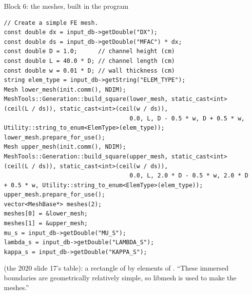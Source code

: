 \documentclass[aspectratio=169,11pt]{beamer}
\begin{document}
\begin{frame}[fragile]{Block 6: the meshes, built in the program}
\label{fr:meshes}
\begin{lstlisting}[style=cpptiny]
// Create a simple FE mesh.
const double dx = input_db->getDouble("DX");
const double ds = input_db->getDouble("MFAC") * dx;
const double D = 1.0;      // channel height (cm)
const double L = 40.0 * D; // channel length (cm)
const double w = 0.01 * D; // wall thickness (cm)
string elem_type = input_db->getString("ELEM_TYPE");
Mesh lower_mesh(init.comm(), NDIM);
MeshTools::Generation::build_square(lower_mesh, static_cast<int>(ceil(L / ds)), static_cast<int>(ceil(w / ds)),
                                    0.0, L, D - 0.5 * w, D + 0.5 * w, Utility::string_to_enum<ElemType>(elem_type));
lower_mesh.prepare_for_use();
Mesh upper_mesh(init.comm(), NDIM);
MeshTools::Generation::build_square(upper_mesh, static_cast<int>(ceil(L / ds)), static_cast<int>(ceil(w / ds)),
                                    0.0, L, 2.0 * D - 0.5 * w, 2.0 * D + 0.5 * w, Utility::string_to_enum<ElemType>(elem_type));
upper_mesh.prepare_for_use();
vector<MeshBase*> meshes(2);
meshes[0] = &lower_mesh;
meshes[1] = &upper_mesh;
mu_s = input_db->getDouble("MU_S");
lambda_s = input_db->getDouble("LAMBDA_S");
kappa_s = input_db->getDouble("KAPPA_S");
\end{lstlisting}
\footnotesize
{} (the 2020 slide 17's table): a rectangle of  by  elements of . ``These immersed boundaries are geometrically relatively simple, so libmesh is used to make the meshes.''
\end{frame}
\end{document}
